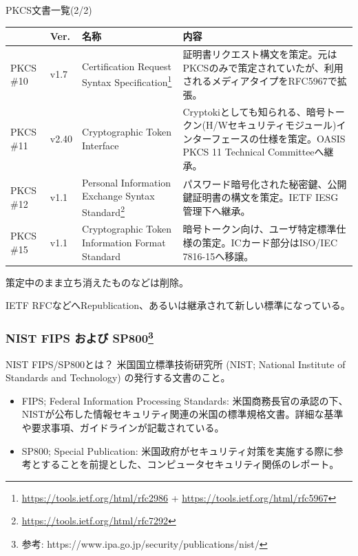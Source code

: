 \documentclass[12pt,dvipdfmx]{beamer}
\begin{document}
\begin{frame}
PKCS文書一覧(2/2)
\begin{table}
\scriptsize
\begin{tabular}{|l|l|p{21ex}|p{40ex}|}
\hline
 & Ver. & 名称 & 内容 \\
\hline\hline
PKCS \#10 & v1.7 & Certification Request Syntax Specification\footnote[frame]{\scriptsize \url{https://tools.ietf.org/html/rfc2986} + \url{https://tools.ietf.org/html/rfc5967}} & 証明書リクエスト構文を策定。元はPKCSのみで策定されていたが、利用されるメディアタイプをRFC5967で拡張。\\
\hline
PKCS \#11 & v2.40 & Cryptographic Token Interface & Cryptokiとしても知られる、暗号トークン(H/Wセキュリティモジュール)インターフェースの仕様を策定。OASIS PKCS 11 Technical Committeeへ継承。\\
\hline
PKCS \#12 & v1.1 & Personal Information Exchange Syntax Standard\footnote[frame]{\scriptsize \url{https://tools.ietf.org/html/rfc7292}} & パスワード暗号化された秘密鍵、公開鍵証明書の構文を策定。IETF IESG管理下へ継承。\\
\hline
PKCS \#15 & v1.1 & Cryptographic Token Information Format Standard & 暗号トークン向け、ユーザ特定標準仕様の策定。ICカード部分はISO/IEC 7816-15へ移譲。\\
\hline
\end{tabular}
\end{table}
策定中のまま立ち消えたものなどは削除。

IETF RFCなどへRepublication、あるいは継承されて新しい標準になっている。
\end{frame}

\begin{frame}
\frametitle{NIST FIPS および SP800\footnote[frame]{参考: https://www.ipa.go.jp/security/publications/nist/}}
\begin{block}{NIST FIPS/SP800とは？}
米国国立標準技術研究所 (NIST; National Institute of Standards and Technology) の発行する文書のこと。
\begin{itemize}
 \item \alert{FIPS; Federal Information Processing Standards}: 米国商務長官の承認の下、NISTが公布した情報セキュリティ関連の米国の標準規格文書。詳細な基準や要求事項、ガイドラインが記載されている。
 \item SP800; Special Publication: 米国政府がセキュリティ対策を実施する際に参考とすることを前提とした、コンピュータセキュリティ関係のレポート。
\end{itemize}
\end{block}
\end{frame}
\end{document}
